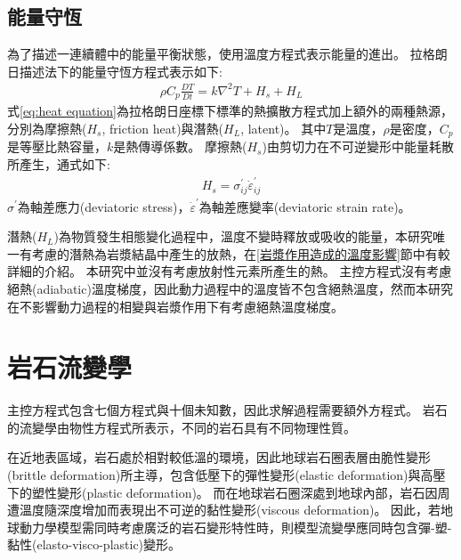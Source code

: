 \subsection{能量守恆}
為了描述一連續體中的能量平衡狀態，使用溫度方程式表示能量的進出。
拉格朗日描述法下的能量守恆方程式表示如下:
\begin{align}
\rho C_p \frac{DT}{Dt} = k\nabla^2T+H_s+H_L
\label{eq:heat equation}
\end{align}
式\ref{eq:heat equation}為拉格朗日座標下標準的熱擴散方程式加上額外的兩種熱源，分別為摩擦熱($H_s$, friction heat)與潛熱($H_L$, latent)。
其中$T$是溫度，$\rho$是密度，$C_p$是等壓比熱容量，$k$是熱傳導係數。
摩擦熱($H_s$)由剪切力在不可逆變形中能量耗散所產生，通式如下:
\begin{align}
    H_s = \sigma^{'}_{ij}\dot\varepsilon^{'}_{ij}
\end{align}
$\sigma^{'}$為軸差應力(deviatoric stress)，$\dot\varepsilon^{'}$為軸差應變率(deviatoric strain rate)。

潛熱($H_L$)為物質發生相態變化過程中，溫度不變時釋放或吸收的能量，本研究唯一有考慮的潛熱為岩漿結晶中產生的放熱，在\ref{岩漿作用造成的溫度影響}節中有較詳細的介紹。
本研究中並沒有考慮放射性元素所產生的熱。
主控方程式沒有考慮絕熱(adiabatic)溫度梯度，因此動力過程中的溫度皆不包含絕熱溫度，然而本研究在不影響動力過程的相變與岩漿作用下有考慮絕熱溫度梯度。

\section{岩石流變學}
主控方程式包含七個方程式與十個未知數，因此求解過程需要額外方程式。
岩石的流變學由物性方程式所表示，不同的岩石具有不同物理性質。

在近地表區域，岩石處於相對較低溫的環境，因此地球岩石圈表層由脆性變形(brittle deformation)所主導，包含低壓下的彈性變形(elastic deformation)與高壓下的塑性變形(plastic deformation)。
而在地球岩石圈深處到地球內部，岩石因周遭溫度隨深度增加而表現出不可逆的黏性變形(viscous deformation)。
因此，若地球動力學模型需同時考慮廣泛的岩石變形特性時，則模型流變學應同時包含彈-塑-黏性(elasto-visco-plastic)變形。

